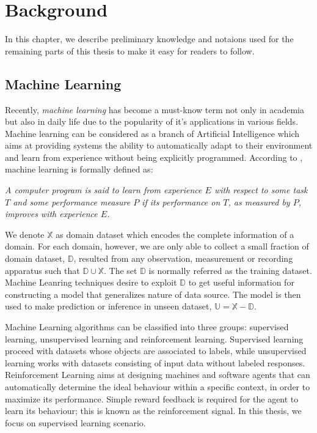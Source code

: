 \chapter{Background}
\label{chap:background}
In this chapter, we describe preliminary knowledge and notaions used for the remaining parts of this thesis to make it easy for readers to follow.
\section{Machine Learning}
Recently, \textit{machine learning} has become a must-know term not only in academia but also in daily life due to the popularity of it's applications in various fields. Machine learning can be considered as a branch of Artificial Intelligence which aims at providing systems the ability to automatically adapt to their environment and learn from experience without being explicitly programmed. According to \cite{mitchell1997machine}, machine learning is formally defined as:

\begin{definition}{}
\textit{A computer program is said to learn from experience $E$ with respect to some task $T$ and some performance measure $P$ if its performance on $T$, as measured by $P$, improves with experience $E$.}
\end{definition}

We denote $\mathbb{X}$ as domain dataset which encodes the complete information of a domain. For each domain, however, we are only able to collect a small fraction of domain dataset, $\mathbb{D}$, resulted from any observation, measurement or recording apparatus such that $\mathbb{D} \cup \mathbb{X}$. The set $\mathbb{D}$ is normally referred as the training dataset. Machine Leanring techniques desire to exploit $\mathbb{D}$ to get useful information for constructing a model that generalizes nature of data source. The model is then used to make prediction or inference in unseen dataset, $\mathbb{U} = \mathbb{X} - \mathbb{D}$.

Machine Learning algorithms can be classified into three groups: supervised learning, unsupervised learning and reinforcement learning. Supervised learning proceed with datasets whose objects are associated to labels, while unsupervised learning works with datasets consisting of input data without labeled responses. Reinforcement Learning aims at designing machines and software agents that can automatically determine the ideal behaviour within a specific context, in order to maximize its performance. Simple reward feedback is required for the agent to learn its behaviour; this is known as the reinforcement signal. In this thesis, we focus on supervised learning scenario. 

